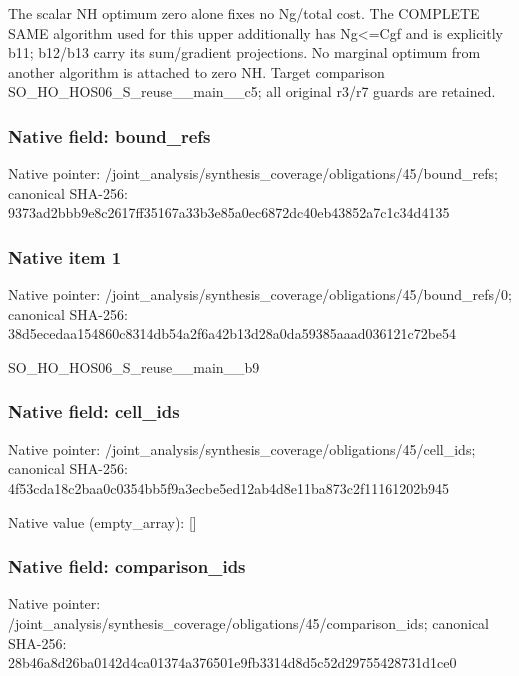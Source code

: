 \documentclass[10pt,a4paper]{article}
\begin{document}
\begingroup\raggedright\sloppy The scalar NH optimum zero alone fixes no Ng/\allowbreak{}total cost. The COMPLETE SAME algorithm used for this upper additionally has Ng<=\allowbreak{}Cgf and is explicitly b11;\allowbreak{} b12/\allowbreak{}b13 carry its sum/\allowbreak{}gradient projections. No marginal optimum from another algorithm is attached to zero NH. Target comparison SO\_\allowbreak{}HO\_\allowbreak{}HOS06\_\allowbreak{}S\_\allowbreak{}reuse\_\allowbreak{}\_\allowbreak{}main\_\allowbreak{}\_\allowbreak{}c5;\allowbreak{} all original r3/\allowbreak{}r7 guards are retained.\par\endgroup

\subsubsection{Native field: bound\_\allowbreak{}refs}
Native pointer: /joint\_\allowbreak{}analysis/synthesis\_\allowbreak{}coverage/obligations/45/bound\_\allowbreak{}refs; canonical SHA-256: 9373ad2bbb9e8c2617ff35167a33b3e85a0ec6872dc40eb43852a7c1c34d4135

\subsubsection{Native item 1}
Native pointer: /joint\_\allowbreak{}analysis/synthesis\_\allowbreak{}coverage/obligations/45/bound\_\allowbreak{}refs/0; canonical SHA-256: 38d5ecedaa154860c8314db54a2f6a42b13d28a0da59385aaad036121c72be54

\begingroup\raggedright\sloppy SO\_\allowbreak{}HO\_\allowbreak{}HOS06\_\allowbreak{}S\_\allowbreak{}reuse\_\allowbreak{}\_\allowbreak{}main\_\allowbreak{}\_\allowbreak{}b9\par\endgroup

\subsubsection{Native field: cell\_\allowbreak{}ids}
Native pointer: /joint\_\allowbreak{}analysis/synthesis\_\allowbreak{}coverage/obligations/45/cell\_\allowbreak{}ids; canonical SHA-256: 4f53cda18c2baa0c0354bb5f9a3ecbe5ed12ab4d8e11ba873c2f11161202b945

Native value (empty\_\allowbreak{}array): []

\subsubsection{Native field: comparison\_\allowbreak{}ids}
Native pointer: /joint\_\allowbreak{}analysis/synthesis\_\allowbreak{}coverage/obligations/45/comparison\_\allowbreak{}ids; canonical SHA-256: 28b46a8d26ba0142d4ca01374a376501e9fb3314d8d5c52d29755428731d1ce0
\end{document}
